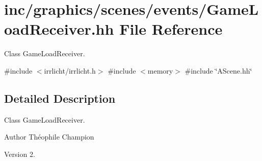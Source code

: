 \hypertarget{GameLoadReceiver_8hh}{}\section{inc/graphics/scenes/events/\+Game\+Load\+Receiver.hh File Reference}
\label{GameLoadReceiver_8hh}


Class Game\+Load\+Receiver.  


{\ttfamily \#include $<$irrlicht/irrlicht.\+h$>$}\newline
{\ttfamily \#include $<$memory$>$}\newline
{\ttfamily \#include \char`\"{}A\+Scene.\+hh\char`\"{}}\newline


\subsection{Detailed Description}
Class Game\+Load\+Receiver. 

\begin{DoxyAuthor}{Author}
Théophile Champion 
\end{DoxyAuthor}
\begin{DoxyVersion}{Version}
2. 
\end{DoxyVersion}
